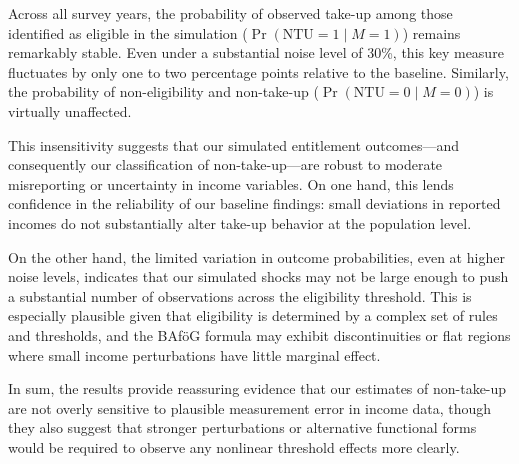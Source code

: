 

Across all survey years, the probability of observed take-up among those identified as eligible in the simulation (\( \Pr(\mathrm{NTU}=1 \mid M=1) \)) remains remarkably stable. 
Even under a substantial noise level of 30\%, this key measure fluctuates by only one to two percentage points relative to the baseline. Similarly, the probability of non-eligibility and non-take-up (\( \Pr(\mathrm{NTU}=0 \mid M=0) \)) is virtually unaffected.

This insensitivity suggests that our simulated entitlement outcomes—and consequently our classification of non-take-up—are robust to moderate misreporting or uncertainty in income variables. 
On one hand, this lends confidence in the reliability of our baseline findings: small deviations in reported incomes do not substantially alter take-up behavior at the population level.

On the other hand, the limited variation in outcome probabilities, even at higher noise levels, indicates that our simulated shocks may not be large enough to push a substantial number of observations across the eligibility threshold. 
This is especially plausible given that eligibility is determined by a complex set of rules and thresholds, and the BAföG formula may exhibit discontinuities or flat regions where small income perturbations have little marginal effect.

In sum, the results provide reassuring evidence that our estimates of non-take-up are not overly sensitive to plausible measurement error in income data, though they also suggest that stronger perturbations or alternative functional forms would be required to observe any nonlinear threshold effects more clearly.
